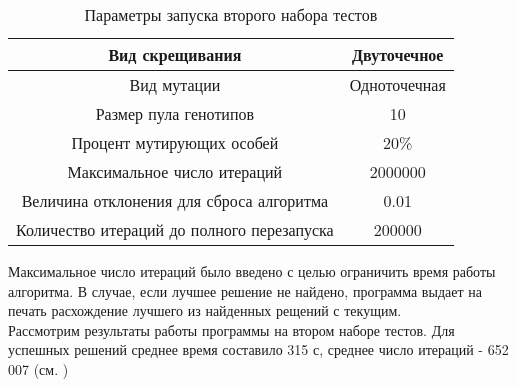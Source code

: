 \begin{table}[ht]
\centering
\caption{Параметры запуска второго набора тестов}
\label{ParamTable}
\begin{tabular}{|c|c|}
\hline
Вид скрещивания                            & Двуточечное  \\ \hline
Вид мутации                                & Одноточечная \\ \hline
Размер пула генотипов                      & 10           \\ \hline
Процент мутирующих особей                  & 20\%         \\ \hline
Максимальное число итераций                & 2000000      \\ \hline
Величина отклонения для сброса алгоритма   & 0.01         \\ \hline
Количество итераций до полного перезапуска & 200000       \\ \hline
\end{tabular}
\end{table}
\FloatBarrier
Максимальное число итераций было введено с целью ограничить время работы алгоритма. В случае, если лучшее решение не найдено, программа выдает на печать расхождение лучшего из найденных рещений с текущим.\\
Рассмотрим результаты работы программы на втором наборе тестов.
Для успешных решений среднее время составило 315 с, среднее число итераций - 652 007 (см. \cite{BigResults1})


